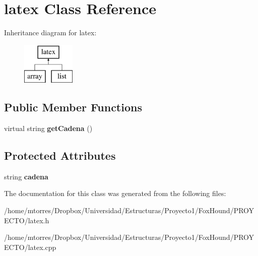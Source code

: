 \hypertarget{classlatex}{\section{latex Class Reference}
\label{classlatex}
}
Inheritance diagram for latex\-:\begin{figure}[H]
\begin{center}
\leavevmode
\includegraphics[height=2.000000cm]{classlatex}
\end{center}
\end{figure}
\subsection*{Public Member Functions}
\begin{DoxyCompactItemize}
\item 
\hypertarget{classlatex_a087cec6e7708a663c6de8fceb5028fa7}{virtual string {\bfseries get\-Cadena} ()}\label{classlatex_a087cec6e7708a663c6de8fceb5028fa7}

\end{DoxyCompactItemize}
\subsection*{Protected Attributes}
\begin{DoxyCompactItemize}
\item 
\hypertarget{classlatex_ad55bec26256e48f114d250bed4a3f35d}{string {\bfseries cadena}}\label{classlatex_ad55bec26256e48f114d250bed4a3f35d}

\end{DoxyCompactItemize}


The documentation for this class was generated from the following files\-:\begin{DoxyCompactItemize}
\item 
/home/mtorres/\-Dropbox/\-Universidad/\-Estructuras/\-Proyecto1/\-Fox\-Hound/\-P\-R\-O\-Y\-E\-C\-T\-O/latex.\-h\item 
/home/mtorres/\-Dropbox/\-Universidad/\-Estructuras/\-Proyecto1/\-Fox\-Hound/\-P\-R\-O\-Y\-E\-C\-T\-O/latex.\-cpp\end{DoxyCompactItemize}
